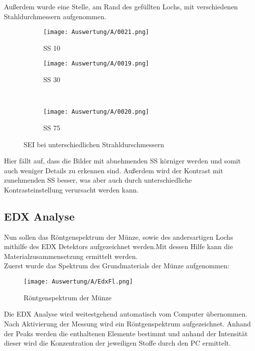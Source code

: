 \newpage
Außerdem wurde eine Stelle, am Rand des gefüllten Lochs, mit verschiedenen Stahldurchmessern aufgenommen.
\begin{figure}[h]
    \centering
    
    \begin{subfigure}[b]{0.45\textwidth}
        \centering
        \texttt{[image: Auswertung/A/0021.png]}
        \caption{SS 10}
    \end{subfigure}
    \hfill
    \begin{subfigure}[b]{0.45\textwidth}
        \centering
        \texttt{[image: Auswertung/A/0019.png]}
        \caption{SS 30}
    \end{subfigure}
    \\
    \begin{subfigure}[b]{0.45\textwidth}
        \centering
        \texttt{[image: Auswertung/A/0020.png]}
        \caption{SS 75}
    \end{subfigure}
    \caption{SEI bei unterschiedlichen Strahldurschmessern}
\end{figure}

Hier fällt auf, dass die Bilder mit abnehmenden SS körniger werden und somit auch weniger Details zu erkennen sind. Außerdem wird der Kontrast mit zunehmenden SS besser, was aber auch durch unterschiedliche Kontrasteinstellung verursacht werden kann.

\newpage
\subsection*{EDX Analyse}
Nun sollen das Röntgenspektrum der Münze, sowie des andersartigen Lochs mithilfe des EDX Detektors aufgezeichnet werden.Mit dessen Hilfe kann die Materialzusammensetzung ermittelt werden. \\

Zuerst wurde das Spektrum des Grundmaterials der Münze aufgenommen: 
\begin{figure}[h]
    \centering
    \texttt{[image: Auswertung/A/EdxFl.png]}
    \caption{Röntgenspektrum der Münze}
\end{figure}

Die EDX Analyse wird weitestgehend automatisch vom Computer übernommen. Nach Aktivierung der Messung wird ein Röntgenspektrum aufgezeichnet. Anhand der Peaks werden die enthaltenen Elemente bestimmt und anhand der Intensität dieser wird die Konzentration der jeweiligen Stoffe durch den PC ermittelt.


